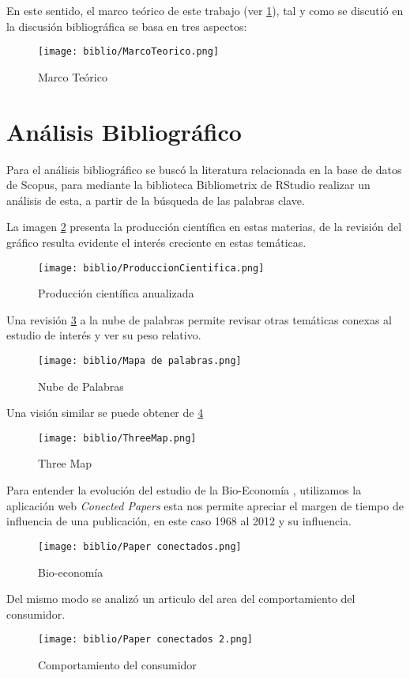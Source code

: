 \documentclass{article}
\begin{document}
En este sentido, el marco teórico de este trabajo (ver \ref{mt}), tal y como se discutió en la discusión bibliográfica se basa en tres aspectos:

\begin{figure}[H]
\texttt{[image: biblio/MarcoTeorico.png]}
\centering
\caption{Marco Teórico}
\label{mt}
\end{figure}

 \section{Análisis Bibliográfico}

Para el análisis bibliográfico se buscó la literatura relacionada en la base de datos de Scopus, para mediante la biblioteca Bibliometrix de RStudio realizar un análisis de esta, a partir de la búsqueda de las palabras clave.

La imagen \ref{pc} presenta la producción científica en estas materias, de la revisión del gráfico resulta evidente el interés creciente en estas temáticas.

\begin{figure}[H]
\texttt{[image: biblio/ProduccionCientifica.png]}
\centering
\caption{Producción científica anualizada}
\label{pc}
\end{figure}

Una revisión \ref{mp} a la nube de palabras permite revisar otras temáticas conexas al estudio de interés y ver su peso relativo.

\begin{figure}[H]
\texttt{[image: biblio/Mapa de palabras.png]}
\centering
\caption{Nube de Palabras}
\label{mp}
\end{figure}

Una visión similar se puede obtener de \ref{tm}

\begin{figure}[H]
\texttt{[image: biblio/ThreeMap.png]}
\centering
\caption{Three Map}
\label{tm}
\end{figure}

Para entender la evolución del estudio de la Bio-Economía \cite{georgescu-roegen_1972_1976}, utilizamos la aplicación web \textit{Conected Papers} esta nos permite apreciar el margen de tiempo de influencia de una publicación, en este caso 1968 al 2012 y su influencia. 

\begin{figure}[H]
\texttt{[image: biblio/Paper conectados.png]}
\centering
\caption{Bio-economía}
\label{pc1}
\end{figure}

Del mismo modo se analizó un articulo del area del comportamiento del consumidor\cite{gul_coarse_2017}.

\begin{figure}[H]
\texttt{[image: biblio/Paper conectados 2.png]}
\centering
\caption{Comportamiento del consumidor}
\label{pc2}
\end{figure}


\nocite{*}
    
\end{document}
